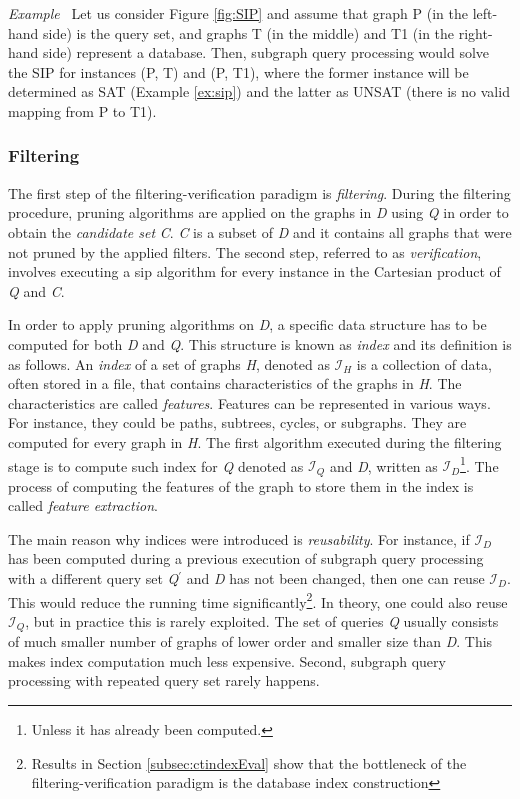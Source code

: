 \documentclass{l4proj}
\newcounter{example}[section]
\newenvironment{example}[1][]{\refstepcounter{example}\par\medskip
   \noindent \textit{Example~\theexample #1} \rmfamily}{\medskip}
\newcommand{\fancyI}{\mathcal{I}}
\begin{document}
\begin{example}
\label{ex:pathIndexing}
Let us consider Figure \ref{fig:SIP} and assume that graph P (in the left-hand side) is the query set, and graphs T (in the middle) and T1 (in the right-hand side) represent a database. Then, subgraph query processing would solve the SIP for instances (P, T) and (P, T1), where the former instance will be determined as SAT (Example \ref{ex:sip}) and the latter as UNSAT (there is no valid mapping from P to T1). 
\end{example}

\subsubsection{Filtering}

The first step of the filtering-verification paradigm is \emph{filtering}. During the filtering procedure, pruning algorithms are applied on the graphs in \emph{D} using \emph{Q} in order to obtain the \emph{candidate set} \emph{C}. \emph{C} is a subset of \emph{D} and it contains all graphs that were not pruned by the applied filters. The second step, referred to as \emph{verification}, involves executing a \gls{sip} algorithm for every instance in the Cartesian product of \emph{Q} and \emph{C}.

In order to apply pruning algorithms on \emph{D}, a specific data structure has to be computed for both \emph{D} and \emph{Q}. This structure is known as \emph{index} and its definition is as follows. An \emph{index} of a set of graphs \emph{H}, denoted as $\fancyI_{H}$ is a collection of data, often stored in a file, that contains characteristics of the graphs in \emph{H}. The characteristics are called \emph{features}. Features can be represented in various ways. For instance, they could be paths, subtrees, cycles, or subgraphs. They are computed for every graph in \emph{H}. The first algorithm executed during the filtering stage is to compute such index for \emph{Q} denoted as $\fancyI_{Q}$ and \emph{D}, written as $\fancyI_{D}$\footnote{Unless it has already been computed.}. The process of computing the features of the graph to store them in the index is called \emph{feature extraction}.

The main reason why indices were introduced is \emph{reusability}. For instance, if $\fancyI_{D}$ has been computed during a previous execution of subgraph query processing with a different query set \emph{Q$^{\prime}$} and \emph{D} has not been changed, then one can reuse $\fancyI_{D}$. This would reduce the running time significantly\footnote{Results in Section \ref{subsec:ctindexEval} show that the bottleneck of the filtering-verification paradigm is the database index construction}. In theory, one could also reuse $\fancyI_{Q}$, but in practice this is rarely exploited. The set of queries \emph{Q} usually consists of much smaller number of graphs of lower order and smaller size than \emph{D}. This makes index computation much less expensive. Second, subgraph query processing with repeated query set rarely happens. 
\end{document}
